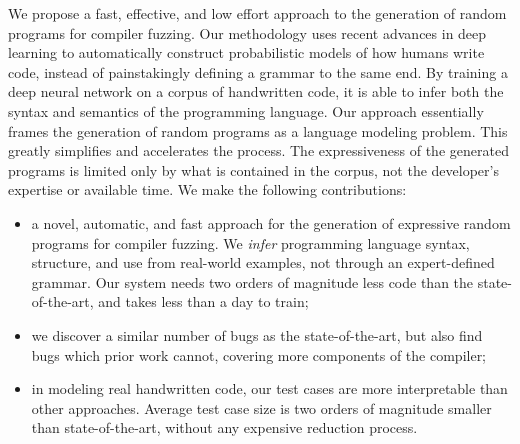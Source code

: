 We propose a fast, effective, and low effort approach to the generation of random programs for compiler fuzzing. Our methodology uses recent advances in deep learning to automatically construct probabilistic models of how humans write code, instead of painstakingly defining a grammar to the same end. By training a deep neural network on a corpus of handwritten code, it is able to infer both the syntax and semantics of the programming language. Our approach essentially frames the generation of random programs as a language modeling problem. This greatly simplifies and accelerates the process. The expressiveness of the generated programs is limited only by what is contained in the corpus, not the developer's expertise or available time. We make the following contributions:
\vspace{-.2em}
\begin{itemize}
\itemsep0em 
\item a novel, automatic, and fast approach for the generation of expressive random programs for compiler fuzzing. We \emph{infer} programming language syntax, structure, and use from real-world examples, not through an expert-defined grammar. Our system needs two orders of magnitude less code than the state-of-the-art, and takes less than a day to train;
\item we discover a similar number of bugs as the state-of-the-art, but also find bugs which prior work cannot, covering more components of the compiler;
\item in modeling real handwritten code, our test cases are more interpretable than other approaches. Average test case size is two orders of magnitude smaller than state-of-the-art, without any expensive reduction process.
\end{itemize}
\vspace{-1em}
